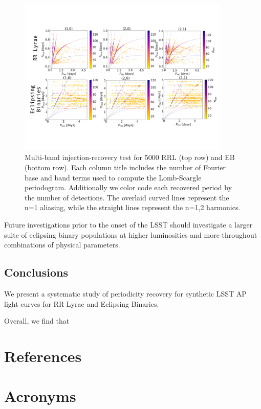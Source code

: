 \documentclass[DM,authoryear,toc]{lsstdoc}
\begin{document}
\begin{figure}
  \includegraphics[width=0.9\textwidth]{figures/multi_lsp_rectest.pdf}
  \centering 
  \caption{Multi-band injection-recovery test for 5000 RRL (top row) and EB (bottom row). Each column title includes the number of Fourier base and band terms used to compute the Lomb-Scargle periodogram. Additionally we color code each recovered period by the number of detections. The overlaid curved lines represent the n=1 aliasing, while the straight lines represent the n=1,2 harmonics.}
  \label{fig:multi_lsp_custom}
\end{figure}



Future investigations prior to the onset of the LSST should investigate a larger suite of eclipsing binary populations at higher luminosities and more throughout  combinations of physical parameters. 

\subsection{Conclusions}

We present a systematic study of periodicity recovery for synthetic LSST AP light curves for RR Lyrae and Eclipsing Binaries.

Overall, we find that 


\appendix
\section{References} \label{sec:bib}


\section{Acronyms} \label{sec:acronyms}

\end{document}
